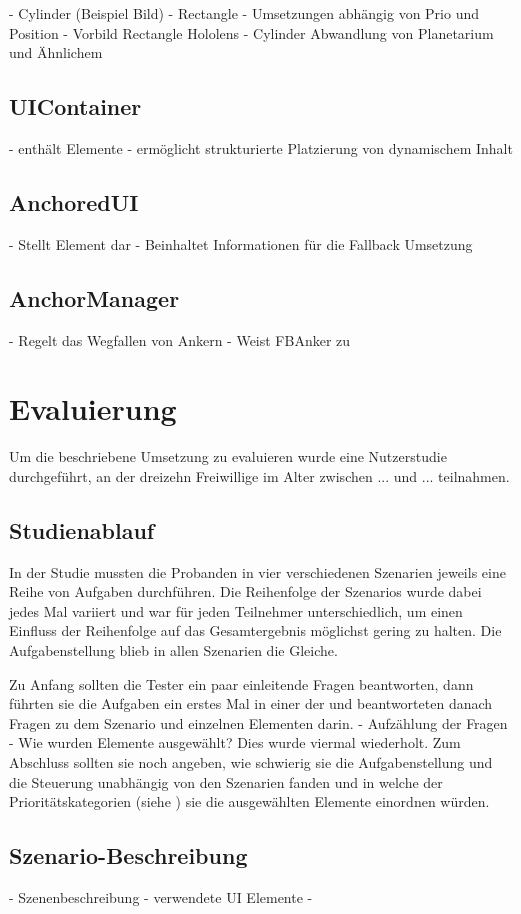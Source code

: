 			- Cylinder (Beispiel Bild)
			- Rectangle 
			- Umsetzungen abhängig von Prio und Position
			- Vorbild Rectangle Hololens
			- Cylinder Abwandlung von Planetarium und Ähnlichem
		
		\subsection{UIContainer}
			- enthält Elemente
			- ermöglicht strukturierte Platzierung von dynamischem Inhalt
		
		\subsection{AnchoredUI}
			- Stellt Element dar
			- Beinhaltet Informationen für die Fallback Umsetzung
		
		\subsection{AnchorManager}
			- Regelt das Wegfallen von Ankern
			- Weist FBAnker zu
			
	\section{Evaluierung}
		Um die beschriebene Umsetzung zu evaluieren wurde eine Nutzerstudie durchgeführt, an der dreizehn Freiwillige im Alter zwischen ... und ... teilnahmen. 
	
		\subsection{Studienablauf}
			In der Studie mussten die Probanden in vier verschiedenen Szenarien jeweils eine Reihe von Aufgaben durchführen. Die Reihenfolge der Szenarios wurde dabei jedes Mal variiert und war für jeden Teilnehmer unterschiedlich, um einen Einfluss der Reihenfolge auf das Gesamtergebnis möglichst gering zu halten. Die Aufgabenstellung blieb in allen Szenarien die Gleiche.
			
			
			
			Zu Anfang sollten die Tester ein paar einleitende Fragen beantworten, dann führten sie die Aufgaben ein erstes Mal in einer der  und beantworteten danach Fragen zu dem Szenario und einzelnen Elementen darin.
			- Aufzählung der Fragen
			- Wie wurden Elemente ausgewählt?
			Dies wurde viermal wiederholt. Zum Abschluss sollten sie noch angeben, wie schwierig sie die Aufgabenstellung und die Steuerung unabhängig von den Szenarien fanden und in welche der Prioritätskategorien (siehe ) sie die ausgewählten Elemente einordnen würden.
		
		\subsection{Szenario-Beschreibung}
			- Szenenbeschreibung
			- verwendete UI Elemente
			- 
		
		